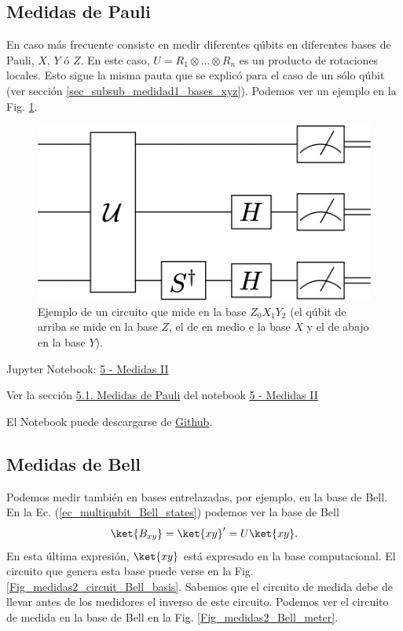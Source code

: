 \documentclass[a4paper,11pt]{book} %
\numberwithin{equation}{chapter}
\begin{document}
 
        \subsection{Medidas de Pauli}

En caso más frecuente consiste en medir diferentes qúbits en diferentes bases de Pauli, $X$, $Y$ ó $Z$. En este caso, $U= R_1\otimes \ldots \otimes R_n$ es un producto de rotaciones locales. Esto sigue la misma pauta que se explicó para el caso de un sólo qúbit (ver sección \ref{sec_subsub_medidad1_bases_xyz}). Podemos ver un ejemplo en la Fig. \ref{Fig_medidas2_XYZ_multimeter}.

	\begin{figure}[H]
	\centering 
	\includegraphics[width=0.3\linewidth]{Figuras/Fig_medidas2_XYZ_multimeter.png}
	\caption{Ejemplo de un circuito que mide en la base $Z_0X_1Y_2$ (el qúbit de arriba se mide en la base $Z$, el de en medio e la base $X$ y el de abajo en la base $Y$).}
	\label{Fig_medidas2_XYZ_multimeter}
	\end{figure}


	\begin{mybox_orange}{Jupyter Notebook: \href{https://www.scbi.uma.es/web/wp-content/uploads/Jupyterbook/CICC_UMA/Notebooks/html/docs/Part_01/Chapter_05-Medidas_II_myst.html}{5 - Medidas II}}

	Ver la sección \href{https://www.scbi.uma.es/web/wp-content/uploads/Jupyterbook/CICC_UMA/Notebooks/html/docs/Part_01/Chapter_05-Medidas_II_myst.html#medidas-de-pauli}{5.1. Medidas de Pauli} del notebook \href{https://www.scbi.uma.es/web/wp-content/uploads/Jupyterbook/CICC_UMA/Notebooks/html/docs/Part_01/Chapter_05-Medidas_II_myst.html}{5 - Medidas II}
	
	El Notebook puede descargarse de \href{https://github.com/davidcb98/CICC_UMA/blob/master/Notebooks/Part_01/Chapter_05-Medidas_II.ipynb}{Github}.
	\end{mybox_orange}

	

        \subsection{Medidas de Bell}

Podemos medir también en bases entrelazadas, por ejemplo, en la base de Bell. En la Ec. (\ref{ec_multiqubit_Bell_states}) podemos ver la base de Bell 
	\begin{equation} \label{ec_medidas2_base_Bell_from_Z}
	\ket{B_{xy}} = \ket{xy}'  = U \ket{xy}.
	\end{equation}
En esta última expresión, $\ket{xy}$ está expresado en la base computacional.  El circuito que genera esta base puede verse en la Fig. \ref{Fig_medidas2_circuit_Bell_basis}. Sabemos que el circuito de medida debe de llevar antes de los medidores el inverso de este circuito. Podemos ver el circuito de medida en la base de Bell en la Fig. \ref{Fig_medidas2_Bell_meter}.
\end{document}
